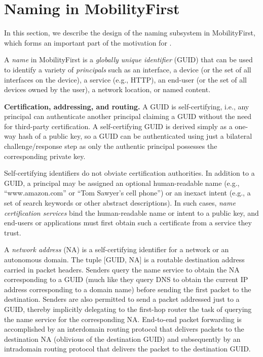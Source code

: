 \section{Naming in MobilityFirst}
\label{sec:MF}

In this section, we describe the design of the naming subsystem in MobilityFirst, which forms an important part of the motivation for \auspice. %

A {\em name} in MobilityFirst is a {\em globally unique identifier} (GUID) that can be used to identify a variety of {\em principals} such as an interface, a device (or the set of all interfaces on the device), a service (e.g., HTTP), an end-user (or the set of all devices owned by the user), a network location, or named content. 

\textbf{Certification, addressing, and routing.} A GUID is self-certifying, i.e., any principal can authenticate another principal claiming a GUID without the need for third-party certification. A self-certifying GUID is derived simply as a one-way hash of a public key, so a GUID can be authenticated using just a bilateral challenge/response step as only the authentic principal possesses the corresponding private key. 

Self-certifying identifiers do not obviate certification authorities. In addition to a GUID, a principal may be assigned an optional human-readable name (e.g., ``www.amazon.com'' or ``Tom Sawyer's cell phone'')  or an inexact intent (e.g., a set of search keywords or other abstract descriptions). In such cases, {\em name certification services} bind the human-readable name or intent to a public key, and end-users or applications must first obtain such a certificate from a service they trust.

A {\em network address} (NA) is a self-certifying identifier for a network or an autonomous domain. The tuple [GUID, NA] is a routable destination address carried in packet headers. Senders query the name service to obtain the NA corresponding to a GUID (much like they query DNS to obtain the current IP address corresponding to a domain name) before sending the first packet to the destination. Senders are also permitted to send a packet addressed just to a GUID, thereby implicitly delegating to the first-hop router the task of querying the name service for the corresponding NA. End-to-end packet forwarding is accomplished by an interdomain routing protocol that delivers packets to the destination NA (oblivious of the destination GUID) and subsequently by an intradomain routing protocol that delivers the packet to the destination GUID.

